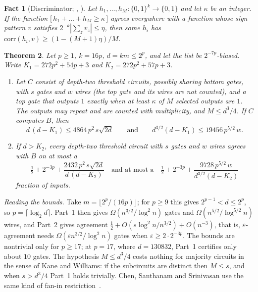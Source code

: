 \documentclass[11pt,letterpaper]{article}
\newtheorem{theorem}{Theorem}
\newtheorem{fact}[theorem]{Fact}
\theoremstyle{remark}
\newcommand{\bits}{\{0,1\}}
\newcommand{\ind}[1]{\bigl[\,#1\,\bigr]}
\begin{document}
\begin{fact}[Discriminator; {\cite{HMPST}}, {\cite[Prop.~9.5]{CSS}}]\label{fact:disc}
Let $h_1,\dots,h_M:\bits^k\to\bits$ and let $\kappa$ be an integer. If the
function $\ind{h_1+\dots+h_M\ge\kappa}$ agrees everywhere with a function whose
sign pattern $v$ satisfies $2^{-k}|\sum_zv_z|\le\eta$, then some $h_i$ has
$\mathrm{corr}(h_i,v)\ge(1-(M+1)\eta)/M$.
\end{fact}

\begin{theorem}\label{thm:B}
Let $p\ge1$, $k=16p$, $d=km\le2^p$, and let the list be $2^{-7p}$-biased.
Write $K_1=272p^2+54p+3$ and $K_2=272p^2+57p+3$.
\begin{enumerate}
\item Let $C$ consist of depth-two threshold circuits, possibly sharing bottom
      gates, with $s$ gates and $w$ wires (the top gate and its wires are not
      counted), and a top gate that outputs $1$ exactly when at least $\kappa$
      of $M$ selected outputs are $1$. The outputs may repeat and are counted
      with multiplicity, and $M\le d^3/4$. If $C$ computes $B$, then
      \[
      d\,(d-K_1)\le4864\,p^2\,s\sqrt{2d}\qquad\text{and}\qquad
      d^{3/2}(d-K_1)\le19456\,p^{5/2}\,w .
      \]
\item If $d>K_2$, every depth-two threshold circuit with $s$ gates and $w$
      wires agrees with $B$ on at most a
      \[
      \tfrac12+2^{-3p}+\frac{2432\,p^2\,s\sqrt{2d}}{d\,(d-K_2)}
      \quad\text{and at most a}\quad
      \tfrac12+2^{-3p}+\frac{9728\,p^{5/2}\,w}{d^{3/2}(d-K_2)}
      \]
      fraction of inputs.
\end{enumerate}
\end{theorem}
\emph{Reading the bounds.} Take $m=\lfloor2^p/(16p)\rfloor$; for $p\ge9$ this
gives $2^{p-1}<d\le2^p$, so $p=\lceil\log_2d\rceil$. Part~1 then gives
$\Omega(n^{3/2}/\log^2n)$ gates and $\Omega(n^{5/2}/\log^{5/2}n)$ wires, and
Part~2 gives agreement $\tfrac12+O(s\log^2n/n^{3/2})+O(n^{-3})$, that is,
$\varepsilon$-agreement needs $\Omega(\varepsilon n^{3/2}/\log^2n)$ gates when
$\varepsilon\ge2\cdot2^{-3p}$. The bounds are nontrivial only for $p\ge17$; at
$p=17$, where $d=130832$, Part~1 certifies only about $10$ gates. The
hypothesis $M\le d^3/4$ costs nothing for majority circuits in the sense of
Kane and Williams: if the subcircuits are distinct then $M\le s$, and when
$s>d^3/4$ Part~1 holds trivially. Chen, Santhanam and Srinivasan use the same
kind of fan-in restriction~\cite[Lemma~9.8]{CSS}.
\end{document}
